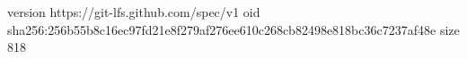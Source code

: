 version https://git-lfs.github.com/spec/v1
oid sha256:256b55b8c16ec97fd21e8f279af276ee610c268cb82498e818bc36c7237af48e
size 818
